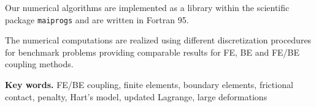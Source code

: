 Our numerical algorithms are implemented as a library within the scientific package {\tt maiprogs} and are written in Fortran 95.

The numerical computations are realized using different discretization procedures for benchmark problems   providing comparable results for FE, BE and FE/BE coupling methods.






\textbf{Key words.} FE/BE coupling,  finite elements, boundary elements, frictional contact, penalty, Hart's model, updated Lagrange, large deformations